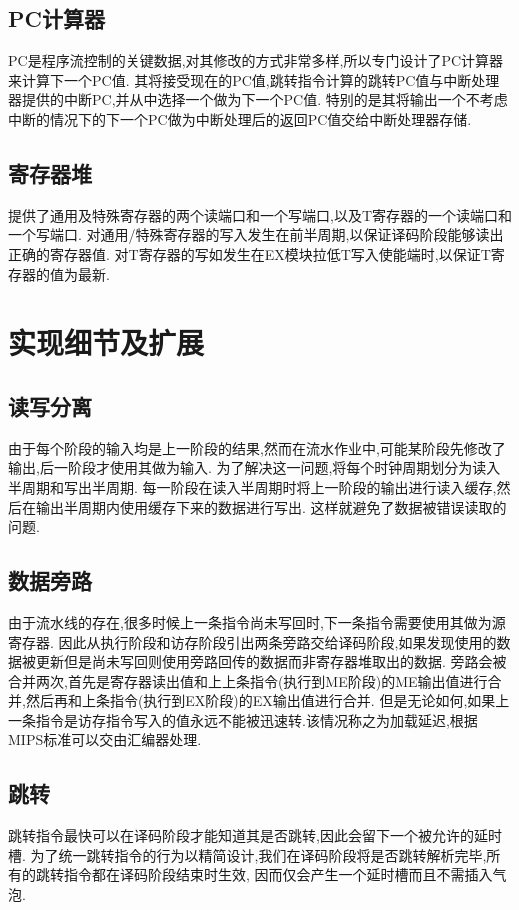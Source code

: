   \subsection{PC计算器}
    PC是程序流控制的关键数据,对其修改的方式非常多样,所以专门设计了PC计算器来计算下一个PC值.
    其将接受现在的PC值,跳转指令计算的跳转PC值与中断处理器提供的中断PC,并从中选择一个做为下一个PC值.
    特别的是其将输出一个不考虑中断的情况下的下一个PC做为中断处理后的返回PC值交给中断处理器存储.
  \subsection{寄存器堆}
    提供了通用及特殊寄存器的两个读端口和一个写端口,以及T寄存器的一个读端口和一个写端口.
    对通用/特殊寄存器的写入发生在前半周期,以保证译码阶段能够读出正确的寄存器值.
    对T寄存器的写如发生在EX模块拉低T写入使能端时,以保证T寄存器的值为最新.

\section{实现细节及扩展}

\subsection{读写分离}
由于每个阶段的输入均是上一阶段的结果,然而在流水作业中,可能某阶段先修改了输出,后一阶段才使用其做为输入.
为了解决这一问题,将每个时钟周期划分为读入半周期和写出半周期.
每一阶段在读入半周期时将上一阶段的输出进行读入缓存,然后在输出半周期内使用缓存下来的数据进行写出.
这样就避免了数据被错误读取的问题.
\subsection{数据旁路}
由于流水线的存在,很多时候上一条指令尚未写回时,下一条指令需要使用其做为源寄存器.
因此从执行阶段和访存阶段引出两条旁路交给译码阶段,如果发现使用的数据被更新但是尚未写回则使用旁路回传的数据而非寄存器堆取出的数据.
旁路会被合并两次,首先是寄存器读出值和上上条指令(执行到ME阶段)的ME输出值进行合并,然后再和上条指令(执行到EX阶段)的EX输出值进行合并.
但是无论如何,如果上一条指令是访存指令写入的值永远不能被迅速转.该情况称之为加载延迟,根据MIPS标准可以交由汇编器处理.
\subsection{跳转}
跳转指令最快可以在译码阶段才能知道其是否跳转,因此会留下一个被允许的延时槽.
为了统一跳转指令的行为以精简设计,我们在译码阶段将是否跳转解析完毕,所有的跳转指令都在译码阶段结束时生效,
因而仅会产生一个延时槽而且不需插入气泡.
